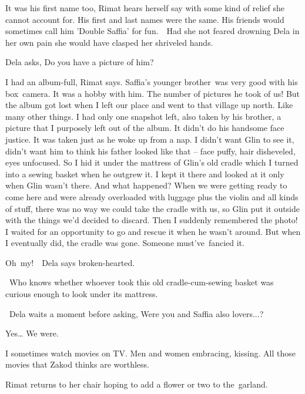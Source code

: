 \documentclass[twoside,11pt]{book}
\begin{document}
{\textquotedbl}It was his first name too,{\textquotedbl} Rimat hears herself say with some kind of relief she cannot
account for. {\textquotedbl}His first and last names were the same. His friends would sometimes call him 'Double
Saffia' for fun.{\textquotedbl}\ \ Had she not feared drowning Dela in her own pain she would have clasped her
shriveled hands.\ 

Dela asks, {\textquotedbl}Do you have a picture of him?{\textquotedbl}

{\textquotedbl}I had an album-full,{\textquotedbl} Rimat says. {\textquotedbl}Saffia's younger brother~was very good
with his box~camera. It was a hobby with him.  The number of pictures he took of us! But the album got lost when I left
our place and went to that village up north. Like many other things. I had only one snapshot left, also taken by his
brother, a picture that I purposely left out of the album. It didn't do his handsome face justice. It was taken just as
he woke up from a nap. I didn't want Glin to see it, didn't want him to think his father looked like that -- face
puffy, hair disheveled, eyes unfocused. So I hid it under the mattress of Glin's old cradle which I turned into a
sewing basket when he outgrew it. I kept it there and looked at it only when Glin wasn't there. And what happened? When
we were getting ready to come here and were already overloaded with luggage plus the violin and all kinds of stuff,
there was no way we could take the cradle with us, so Glin put it outside with the things we'd decided to discard. Then
I suddenly remembered the photo! I waited for an opportunity to go and rescue it when he wasn't around. But when I
eventually did, the cradle was gone. Someone must've~fancied it.{\textquotedbl}

{\textquotedbl}Oh\ my!{\textquotedbl}\ \ Dela says broken{}-hearted. 

~{\textquotedbl}Who knows whether whoever took this old cradle-cum-sewing basket was curious enough to look under its
mattress.{\textquotedbl}

~Dela waits a moment before asking, {\textquotedbl}Were you and Saffia also lovers...?{\textquotedbl}

{\textquotedbl}Yes{\dots} We were.{\textquotedbl}

{\textquotedbl}I sometimes watch movies on TV. Men and women embracing, kissing. All those movies that Zakod thinks are
worthless.{\textquotedbl}

Rimat returns to her chair hoping to add a flower or two to the\ garland.
\end{document}
